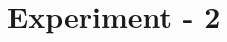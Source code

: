 \documentclass[11pt]{book}
\begin{document}

 

 


\newpage
 \thispagestyle{empty}
\renewcommand{\thesisdedication}{{\large Copyright \copyright~~ The LNMIIT 2018\\}{\large All Rights Reserved\\}}
\thesisdedicationpage


\tableofcontents

\chapter{Experiment - 2}
\label{ch:ex2}


% 

% 

% 






\end{document}
